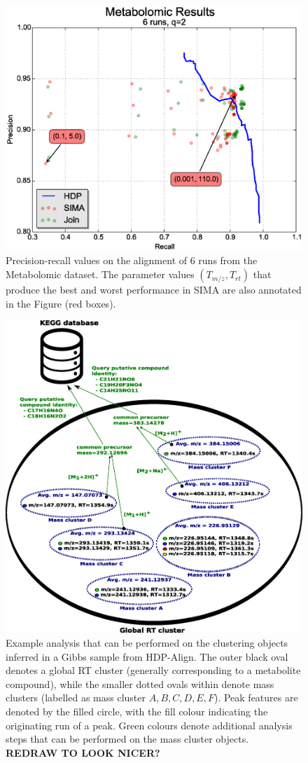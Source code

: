 \begin{figure}[!htbp]
\centering\includegraphics[width=0.7\linewidth]{06-hdp/figures/figure_6.eps}
\centering\caption{\label{fig:metabolomic_results_alignment}Precision-recall values on the alignment of 6 runs from the Metabolomic dataset. The parameter values $(T_{m/z}, T_{rt})$ that produce the best and worst performance in SIMA are also annotated in the Figure (red boxes).}
\end{figure}

\begin{figure}[!htbp]
\centering\includegraphics[width=0.7\linewidth]{06-hdp/figures/figure_7.eps}
\centering\caption{\label{fig:metabolomic_results_annotations}Example analysis that can be performed on the clustering objects inferred in a Gibbs sample from HDP-Align. The outer black oval denotes a global RT cluster (generally corresponding to a metabolite compound), while the smaller dotted ovals within denote mass clusters (labelled as mass cluster $A,B,C,D,E,F$). Peak features are denoted by the filled circle, with the fill colour indicating the originating run of a peak. Green colours denote additional analysis steps that can be performed on the mass cluster objects. \textbf{REDRAW TO LOOK NICER?}}
\end{figure}

